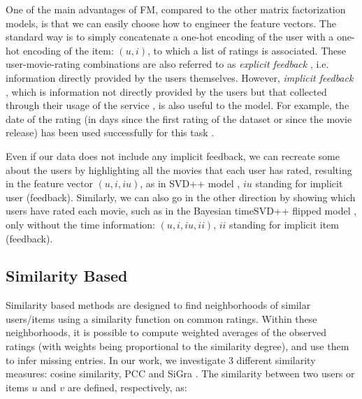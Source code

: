 \documentclass[sigconf]{acmart}
\begin{document}
One of the main advantages of FM, compared to the other matrix factorization models, is that we can easily choose how to engineer the feature vectors. 
The standard way is to simply concatenate a one-hot encoding of the user with a one-hot encoding of the item: $(u, i)$, to which a list of ratings is associated.
These user-movie-rating combinations are also referred to as \textit{explicit feedback} \cite{Oard1998ImplicitFF}, i.e.  information directly provided by the users themselves. However, \textit{implicit feedback} \cite{Oard1998ImplicitFF}, which is information not directly provided by the users but that collected through their usage of the service \cite{Oard1998ImplicitFF}, is also useful to the model. For example, the date of the rating (in days since the first rating of the dataset or since the movie release) has been used successfully for this task \cite{Koren2009CollaborativeFW}. %

Even if our data does not include any implicit feedback, we can recreate some about the users by highlighting all the movies that each user has rated, resulting in the feature vector $(u, i, iu)$, as in SVD++ model \cite{Koren2008FactorizationMT}, $iu$ standing for implicit user (feedback). 
Similarly, we can also go in the other direction by showing which users have rated each movie, such as in the Bayesian timeSVD++ flipped model \cite{onthediffic}, only without the time information: $(u, i, iu, ii)$, $ii$ standing for implicit item (feedback). 


\subsection{Similarity Based}
Similarity based methods are designed to find neighborhoods of similar users/items using a similarity function on common ratings. 
Within these neighborhoods, it is possible to compute weighted averages of the observed ratings (with weights being proportional to the similarity degree), and use them to infer missing entries.
In our work, we investigate 3 different similarity measures: cosine similarity, PCC and SiGra \cite{wu2017sigra}. The similarity between two users or items $u$ and $v$ are defined, respectively, as:
\end{document}
